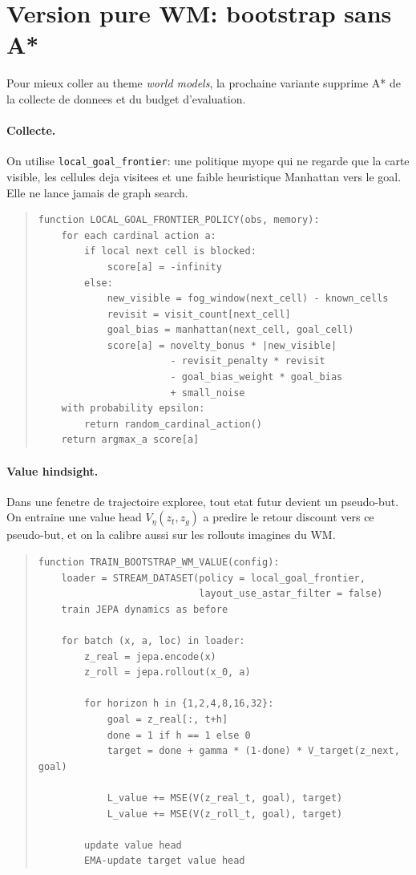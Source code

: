 \documentclass[11pt,a4paper]{article}
\newcommand{\code}[1]{\texttt{#1}}
\begin{document}
\section{Version pure WM: bootstrap sans A*}

Pour mieux coller au theme \emph{world models}, la prochaine variante supprime
A* de la collecte de donnees et du budget d'evaluation.

\paragraph{Collecte.}
On utilise \code{local\_goal\_frontier}: une politique myope qui ne regarde que la
carte visible, les cellules deja visitees et une faible heuristique Manhattan vers
le goal. Elle ne lance jamais de graph search.

\begin{quote}
\small
\begin{verbatim}
function LOCAL_GOAL_FRONTIER_POLICY(obs, memory):
    for each cardinal action a:
        if local next cell is blocked:
            score[a] = -infinity
        else:
            new_visible = fog_window(next_cell) - known_cells
            revisit = visit_count[next_cell]
            goal_bias = manhattan(next_cell, goal_cell)
            score[a] = novelty_bonus * |new_visible|
                       - revisit_penalty * revisit
                       - goal_bias_weight * goal_bias
                       + small_noise
    with probability epsilon:
        return random_cardinal_action()
    return argmax_a score[a]
\end{verbatim}
\end{quote}

\paragraph{Value hindsight.}
Dans une fenetre de trajectoire exploree, tout etat futur devient un pseudo-but.
On entraine une value head \(V_\eta(z_t,z_g)\) a predire le retour discount vers
ce pseudo-but, et on la calibre aussi sur les rollouts imagines du WM.

\begin{quote}
\small
\begin{verbatim}
function TRAIN_BOOTSTRAP_WM_VALUE(config):
    loader = STREAM_DATASET(policy = local_goal_frontier,
                            layout_use_astar_filter = false)
    train JEPA dynamics as before

    for batch (x, a, loc) in loader:
        z_real = jepa.encode(x)
        z_roll = jepa.rollout(x_0, a)

        for horizon h in {1,2,4,8,16,32}:
            goal = z_real[:, t+h]
            done = 1 if h == 1 else 0
            target = done + gamma * (1-done) * V_target(z_next, goal)

            L_value += MSE(V(z_real_t, goal), target)
            L_value += MSE(V(z_roll_t, goal), target)

        update value head
        EMA-update target value head
\end{verbatim}
\end{quote}
\end{document}
